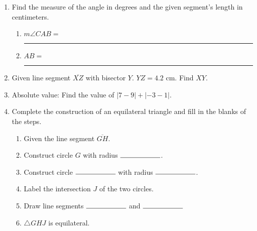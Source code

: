 \documentclass[12pt, twoside]{article}
\begin{document}
\begin{enumerate}
\item Find the measure of the angle in degrees and the given segment's length in centimeters. \vspace{0.25cm}
  \begin{enumerate}
    \item  $m \angle CAB = $ \rule{4cm}{0.15mm} \bigskip
    \item  $AB=$ \rule{4cm}{0.15mm} \bigskip
  \end{enumerate}
  \begin{center}
  \end{center}

\newpage
\item Given line segment $\overline{XZ}$ with bisector $Y$. $YZ=4.2$ cm. Find $XY$.\\[1.5cm]
  \vspace{1cm}

\item Absolute value: Find the value of $|7-9|+|-3-1|$. \vspace{1cm}

\item Complete the construction of an equilateral triangle and fill in the blanks of the steps.
  \begin{enumerate}
    \item Given the line segment $\overline{GH}$. \bigskip
    \item Construct circle $G$ with radius $\rule{2cm}{0.15mm}$. \bigskip
    \item Construct circle $\rule{2cm}{0.15mm}$  with radius $\rule{2cm}{0.15mm}$. \bigskip
    \item Label the intersection $J$ of the two circles. \bigskip
    \item Draw line segments $\rule{2cm}{0.15mm}$  and $\rule{2cm}{0.15mm}$
    \item $\triangle GHJ$ is equilateral.
  \end{enumerate}
  \vspace{5cm}
  \begin{center}
  \end{center}


\end{enumerate}
\end{document}
